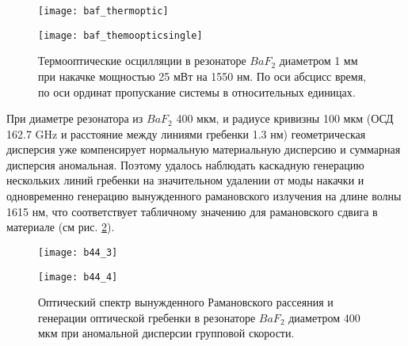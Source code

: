 \begin{figure}[ht]
\begin{minipage}[ht]{0.49\linewidth}\centering
    \texttt{[image: baf\_thermoptic]}
  \end{minipage}
  \hfill
  \begin{minipage}[ht]{0.49\linewidth}\centering
    \texttt{[image: baf\_themoopticsingle]}
  \end{minipage}
    \caption{Термооптические осцилляции в резонаторе $BaF_2$ диаметром 1 мм при накачке мощностью 25 мВт на 1550 нм. По оси абсцисс время, по оси ординат пропускание системы в относительных единицах.}
  \label{baf_thermoptic}
\end{figure}

При диаметре резонатора из $BaF_2$ 400 мкм, и радиусе кривизны 100 мкм (ОСД 162.7 GHz и расстояние между линиями гребенки 1.3 нм) геометрическая дисперсия уже компенсирует нормальную материальную дисперсию и суммарная дисперсия аномальная. Поэтому удалось наблюдать каскадную генерацию нескольких линий гребенки на значительном удалении от моды накачки и одновременно генерацию вынужденного рамановского излучения на длине волны 1615 нм, что соответствует табличному значению для рамановского сдвига в материале (см рис. \ref{baf_comb_anomal}).

\begin{figure}[ht]
\begin{minipage}[ht]{0.49\linewidth}\centering
    \texttt{[image: b44\_3]}
  \end{minipage}
  \hfill
  \begin{minipage}[ht]{0.49\linewidth}\centering
    \texttt{[image: b44\_4]}
  \end{minipage}
    \caption{Оптический спектр вынужденного Рамановского рассеяния и генерации оптической гребенки в резонаторе $BaF_2$ диаметром 400 мкм при аномальной дисперсии групповой скорости.}
  \label{baf_comb_anomal}
\end{figure}

